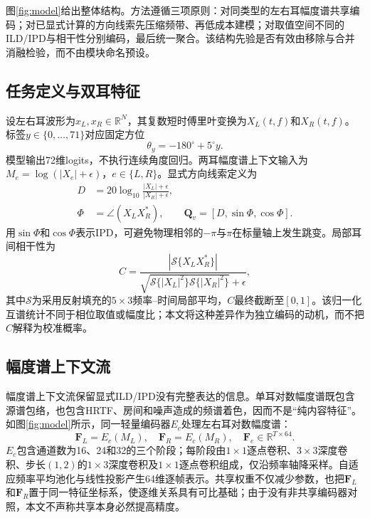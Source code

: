 \documentclass{article}
\begin{document}
图\ref{fig:model}给出整体结构。方法遵循三项原则：对同类型的左右耳幅度谱共享编码；对已显式计算的方向线索先压缩频带、再低成本建模；对取值空间不同的ILD/IPD与相干性分别编码，最后统一聚合。该结构先验是否有效由移除与合并消融检验，而不由模块命名预设。

\subsection{任务定义与双耳特征}

设左右耳波形为$x_L,x_R\in\mathbb{R}^{N}$，其复数短时傅里叶变换为$X_L(t,f)$和$X_R(t,f)$。标签$y\in\{0,\ldots,71\}$对应固定方位
\begin{equation}
    \theta_y=-180^\circ+5^\circ y .
\end{equation}
模型输出72维logits，不执行连续角度回归。两耳幅度谱上下文输入为$M_e=\log(|X_e|+\epsilon)$，$e\in\{L,R\}$。显式方向线索定义为
\begin{align}
 D &=20\log_{10}\frac{|X_L|+\epsilon}{|X_R|+\epsilon}, \\
 \Phi &=\angle(X_LX_R^*),\qquad
 \mathbf{Q}_v=[D,\sin\Phi,\cos\Phi].
\end{align}
用$\sin\Phi$和$\cos\Phi$表示IPD，可避免物理相邻的$-\pi$与$\pi$在标量轴上发生跳变。局部耳间相干性为
\begin{equation}
 C=\frac{|\mathcal{S}\{X_LX_R^*\}|}
 {\sqrt{\mathcal{S}\{|X_L|^2\}\mathcal{S}\{|X_R|^2\}}+\epsilon},
\end{equation}
其中$\mathcal{S}$为采用反射填充的$5\times3$频率--时间局部平均，$C$最终截断至$[0,1]$。该归一化互谱统计不同于相位取值或幅度比；本文将这种差异作为独立编码的动机，而不把$C$解释为校准概率。

\subsection{幅度谱上下文流}

幅度谱上下文流保留显式ILD/IPD没有完整表达的信息。单耳对数幅度谱既包含源谱包络，也包含HRTF、房间和噪声造成的频谱着色，因而不是“纯内容特征”。如图\ref{fig:model}所示，同一轻量编码器$E_c$处理左右耳对数幅度谱：
\begin{equation}
 \mathbf{F}_L=E_c(M_L),\quad \mathbf{F}_R=E_c(M_R),\quad
 \mathbf{F}_e\in\mathbb{R}^{T\times64}.
\end{equation}
$E_c$包含通道数为16、24和32的三个阶段；每阶段由$1\times1$逐点卷积、$3\times3$深度卷积、步长$(1,2)$的$1\times3$深度卷积及$1\times1$逐点卷积组成，仅沿频率轴降采样。自适应频率平均池化与线性投影产生64维逐帧表示。共享权重不仅减少参数，也把$\mathbf{F}_L$和$\mathbf{F}_R$置于同一特征坐标系，使逐维关系具有可比基础；由于没有非共享编码器对照，本文不声称共享本身必然提高精度。
\end{document}
